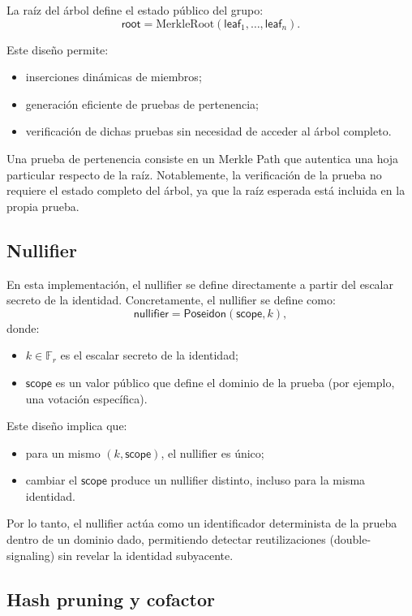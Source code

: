 \documentclass[11pt,a4paper]{article}
\begin{document}
	La raíz del árbol define el estado público del grupo:
	\[
	\mathsf{root} = \mathrm{MerkleRoot}(\mathsf{leaf}_1, \dots, \mathsf{leaf}_n).
	\]
	
	Este diseño permite:
	\begin{itemize}
		\item inserciones dinámicas de miembros;
		\item generación eficiente de pruebas de pertenencia;
		\item verificación de dichas pruebas sin necesidad de acceder al árbol completo.
	\end{itemize}
	
	Una prueba de pertenencia consiste en un Merkle Path que autentica una hoja particular respecto de la raíz. Notablemente, la verificación de la prueba no requiere el estado completo del árbol, ya que la raíz esperada está incluida en la propia prueba.
	
	\subsection{Nullifier}
	
	En esta implementación, el nullifier se define directamente a partir del escalar secreto de la identidad. Concretamente, el nullifier se define como:
	\[
	\mathsf{nullifier} = \mathsf{Poseidon}(\mathsf{scope}, k),
	\]
	donde:
	\begin{itemize}
		\item $k \in \mathbb{F}_r$ es el escalar secreto de la identidad;
		\item $\mathsf{scope}$ es un valor público que define el dominio de la prueba (por ejemplo, una votación específica).
	\end{itemize}
	
	Este diseño implica que:
	\begin{itemize}
		\item para un mismo $(k, \mathsf{scope})$, el nullifier es único;
		\item cambiar el \(\mathsf{scope}\) produce un nullifier distinto, incluso para la misma identidad.
	\end{itemize}
	
	Por lo tanto, el nullifier actúa como un identificador determinista de la prueba dentro de un dominio dado, permitiendo detectar reutilizaciones (double-signaling) sin revelar la identidad subyacente.
	
	\subsection{Hash pruning y cofactor}
	
\end{document}
